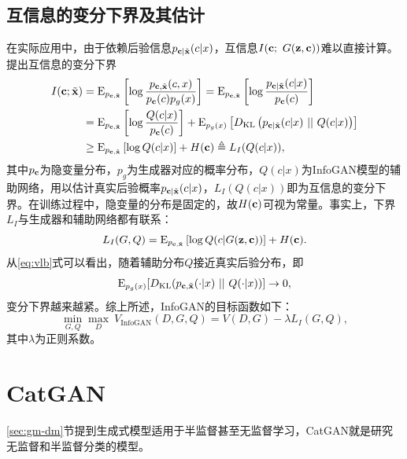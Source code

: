 \subsection{互信息的变分下界及其估计}
在实际应用中，由于依赖后验信息$p_{\mathbf{c}|\tilde{\mathbf{x}}}(c|x)$，互信息$I(\mathbf{c};~G(\mathbf{z},\mathbf{c}))$难以直接计算。\citet{poole2019variational}提出互信息的变分下界
\begin{equation}
  \begin{split}
    I(\mathbf{c}; \tilde{\mathbf{x}}) 
    &= \text{E}_{ p_{\mathbf{c},\tilde{\mathbf{x}}} } \left[ 
      \log \frac{ p_{\mathbf{c},\tilde{\mathbf{x}}}(c, x) } 
                { p_{\mathbf{c}}(c) p_{g}(x) }
              \right] 
      = \text{E}_{ p_{\mathbf{c},\tilde{\mathbf{x}}} } \left[ 
      \log \frac{ p_{\mathbf{c}|\tilde{\mathbf{x}}}(c|x) }
                { p_{\mathbf{c}}(c) }
              \right] \\
      &= \text{E}_{ p_{\mathbf{c}, \tilde{\mathbf{x}}} } \left[
      \log \frac{ Q(c|x) }
                { p_{\mathbf{c}}(c) } 
              \right]
    + \text{E}_{p_g(x)} \left[ 
      D_{\text{KL}} \left( p_{\mathbf{c}|\tilde{\mathbf{x}}}(c|x) ~||~ Q(c|x)
                    \right)
                  \right] \\
    &\ge \text{E}_{ p_{\mathbf{c},\tilde{\mathbf{x}}} } \left[
      \log Q(c|x) \right] + H(\mathbf{c}) 
      \triangleq L_I(Q(c|x)),
  \end{split}
  \label{eq:vlb}
\end{equation}
其中$p_{\mathbf{c}}$为隐变量分布，$p_g$为生成器对应的概率分布，$Q(c|x)$为InfoGAN模型的辅助网络，用以估计真实后验概率$p_{\mathbf{c}|\tilde{\mathbf{x}}}(c|x)$，$L_I(Q(c|x))$即为互信息的变分下界。在训练过程中，隐变量的分布是固定的，故$H(\mathbf{c})$可视为常量。事实上，下界$L_I$与生成器和辅助网络都有联系：
\[
  L_I(G,Q) = \text{E}_{ p_{\mathbf{c},\tilde{\mathbf{x}}} } \left[
  \log Q(c|G(\mathbf{z},\mathbf{c})) \right] + H(\mathbf{c}).
\]
从\eqref{eq:vlb}式可以看出，随着辅助分布$Q$接近真实后验分布，即
\[
  \text{E}_{p_g(x)}[D_{\text{KL}}(p_{\mathbf{c},\tilde{\mathbf{x}}}(\cdot|x) ~||~ Q(\cdot|x))] \to 0,
\]
变分下界越来越紧。综上所述，InfoGAN的目标函数如下：
\begin{equation}
  \min_{G,Q}\max_D ~V_{\text{InfoGAN}}(D,G,Q) = V(D,G) - \lambda L_I(G,Q),
  \label{eq:infogan-obj}
\end{equation}
其中$\lambda$为正则系数。




\section{CatGAN}\label{sec:catgan}
\ref{sec:gm-dm}节提到生成式模型适用于半监督甚至无监督学习，CatGAN\citep{springenberg2015unsupervised}就是研究无监督和半监督分类的模型。

